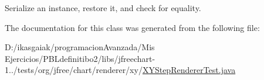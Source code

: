 Serialize an instance, restore it, and check for equality. 

The documentation for this class was generated from the following file\+:\begin{DoxyCompactItemize}
\item 
D\+:/ikasgaiak/programacion\+Avanzada/\+Mis Ejercicios/\+P\+B\+Ldefinitibo2/libs/jfreechart-\/1../tests/org/jfree/chart/renderer/xy/\mbox{\hyperlink{_x_y_step_renderer_test_8java}{X\+Y\+Step\+Renderer\+Test.\+java}}\end{DoxyCompactItemize}
